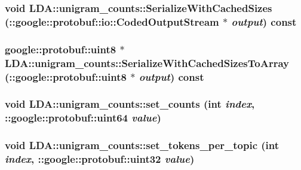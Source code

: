 \label{class_l_d_a_1_1unigram__counts_a977a022d9df1590f2be62efce720596b}
\hypertarget{class_l_d_a_1_1unigram__counts_a92764439a9a35a646fac3e79e4fd0af1}{
\subsubsection[{SerializeWithCachedSizes}]{\setlength{\rightskip}{0pt plus 5cm}void LDA::unigram\_\-counts::SerializeWithCachedSizes (::google::protobuf::io::CodedOutputStream $\ast$ {\em output}) const}}
\label{class_l_d_a_1_1unigram__counts_a92764439a9a35a646fac3e79e4fd0af1}
\hypertarget{class_l_d_a_1_1unigram__counts_ac8d272e80dad410f689cd056790cf219}{
\subsubsection[{SerializeWithCachedSizesToArray}]{\setlength{\rightskip}{0pt plus 5cm}google::protobuf::uint8 $\ast$ LDA::unigram\_\-counts::SerializeWithCachedSizesToArray (::google::protobuf::uint8 $\ast$ {\em output}) const}}
\label{class_l_d_a_1_1unigram__counts_ac8d272e80dad410f689cd056790cf219}
\hypertarget{class_l_d_a_1_1unigram__counts_afd1126030928dc9e7c4321d1587e0a1b}{
\subsubsection[{set\_\-counts}]{\setlength{\rightskip}{0pt plus 5cm}void LDA::unigram\_\-counts::set\_\-counts (int {\em index}, \/  ::google::protobuf::uint64 {\em value})}}
\label{class_l_d_a_1_1unigram__counts_afd1126030928dc9e7c4321d1587e0a1b}
\hypertarget{class_l_d_a_1_1unigram__counts_a7de5819de5f7c49f3cf6ac62088f7cec}{
\subsubsection[{set\_\-tokens\_\-per\_\-topic}]{\setlength{\rightskip}{0pt plus 5cm}void LDA::unigram\_\-counts::set\_\-tokens\_\-per\_\-topic (int {\em index}, \/  ::google::protobuf::uint32 {\em value})}}
